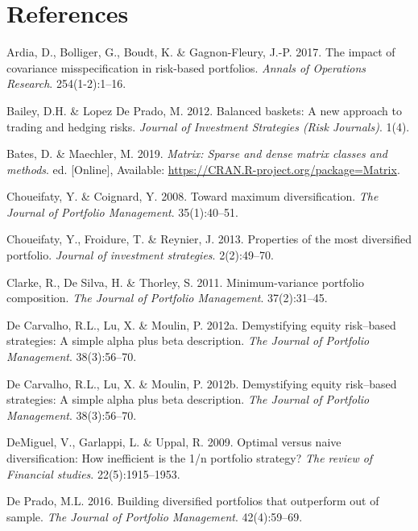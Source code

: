 \documentclass[11pt,preprint, authoryear]{elsarticle}
\numberwithin{equation}{section}
\numberwithin{figure}{section}
\numberwithin{table}{section}
\begin{document}
\hypertarget{references}{%
\section*{References}\label{references}}

\hypertarget{refs}{}
\leavevmode\hypertarget{ref-ardia2017}{}%
Ardia, D., Bolliger, G., Boudt, K. \& Gagnon-Fleury, J.-P. 2017. The
impact of covariance misspecification in risk-based portfolios.
\emph{Annals of Operations Research}. 254(1-2):1--16.

\leavevmode\hypertarget{ref-lopez2012}{}%
Bailey, D.H. \& Lopez De Prado, M. 2012. Balanced baskets: A new
approach to trading and hedging risks. \emph{Journal of Investment
Strategies (Risk Journals)}. 1(4).

\leavevmode\hypertarget{ref-Matrix}{}%
Bates, D. \& Maechler, M. 2019. \emph{Matrix: Sparse and dense matrix
classes and methods}. ed. {[}Online{]}, Available:
\url{https://CRAN.R-project.org/package=Matrix}.

\leavevmode\hypertarget{ref-choueifaty2008}{}%
Choueifaty, Y. \& Coignard, Y. 2008. Toward maximum diversification.
\emph{The Journal of Portfolio Management}. 35(1):40--51.

\leavevmode\hypertarget{ref-choueifaty2013}{}%
Choueifaty, Y., Froidure, T. \& Reynier, J. 2013. Properties of the most
diversified portfolio. \emph{Journal of investment strategies}.
2(2):49--70.

\leavevmode\hypertarget{ref-clarke2011}{}%
Clarke, R., De Silva, H. \& Thorley, S. 2011. Minimum-variance portfolio
composition. \emph{The Journal of Portfolio Management}. 37(2):31--45.

\leavevmode\hypertarget{ref-leote}{}%
De Carvalho, R.L., Lu, X. \& Moulin, P. 2012a. Demystifying equity
risk--based strategies: A simple alpha plus beta description. \emph{The
Journal of Portfolio Management}. 38(3):56--70.

\leavevmode\hypertarget{ref-rawl2012}{}%
De Carvalho, R.L., Lu, X. \& Moulin, P. 2012b. Demystifying equity
risk--based strategies: A simple alpha plus beta description. \emph{The
Journal of Portfolio Management}. 38(3):56--70.

\leavevmode\hypertarget{ref-demiguel2009}{}%
DeMiguel, V., Garlappi, L. \& Uppal, R. 2009. Optimal versus naive
diversification: How inefficient is the 1/n portfolio strategy?
\emph{The review of Financial studies}. 22(5):1915--1953.

\leavevmode\hypertarget{ref-lopez}{}%
De Prado, M.L. 2016. Building diversified portfolios that outperform out
of sample. \emph{The Journal of Portfolio Management}. 42(4):59--69.
\end{document}
